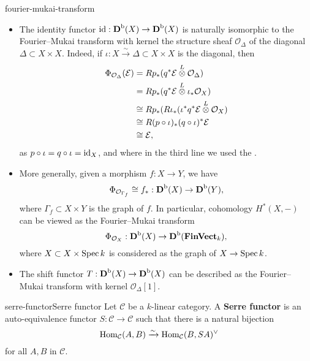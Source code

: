 \begin{example}{fourier-mukai-transform}
    \begin{itemize}
        \item The identity functor $\textup{id} : \textbf{D}^\textup{b}(X) \to \textbf{D}^\textup{b}(X)$ is naturally isomorphic to the Fourier--Mukai transform with kernel the structure sheaf $\mathcal{O}_\Delta$ of the diagonal $\Delta \subset X \times X$. Indeed, if $\iota : X \xrightarrow{\sim} \Delta \subset X \times X$ is the diagonal, then
        \[ \begin{aligned}
            \Phi_{\mathcal{O}_\Delta}(\mathcal{E})
                &= R p_* (q^* \mathcal{E} \overset{L}{\otimes} \mathcal{O}_\Delta) \\
                &= R p_* (q^* \mathcal{E} \overset{L}{\otimes} \iota_* \mathcal{O}_X) \\
                &\cong R p_* (R \iota_* (\iota^* q^* \mathcal{E} \overset{L}{\otimes} \mathcal{O}_X) \\
                &\cong R (p \circ \iota)_* (q \circ \iota)^* \mathcal{E} \\
                &\cong \mathcal{E} ,
        \end{aligned} \]
        as $p \circ \iota = q \circ \iota = \textup{id}_X$, and where in the third line we used the .
        
        \item More generally, given a morphism $f : X \to Y$, we have
        \[ \Phi_{\mathcal{O}_{\Gamma_f}} \cong f_* : \textbf{D}^\textup{b}(X) \to \textbf{D}^\textup{b}(Y) , \]
        where $\Gamma_f \subset X \times Y$ is the graph of $f$. In particular, cohomology $H^*(X, -)$ can be viewed as the Fourier--Mukai transform
        \[ \Phi_{\mathcal{O}_X} : \textbf{D}^\textup{b}(X) \to \textbf{D}^\textup{b}(\textbf{FinVect}_k) , \]
        where $X \subset X \times \operatorname{Spec} k$ is considered as the graph of $X \to \operatorname{Spec} k$.
        
        \item The shift functor $T : \textbf{D}^\textup{b}(X) \to \textbf{D}^\textup{b}(X)$ can be described as the Fourier--Mukai transform with kernel $\mathcal{O}_{\Delta}[1]$.
    \end{itemize}
\end{example}

\begin{topic}{serre-functor}{Serre functor}
    Let $\mathcal{C}$ be a $k$-linear category. A \textbf{Serre functor} is an auto-equivalence functor $S : \mathcal{C} \to \mathcal{C}$ such that there is a natural bijection
    \[ \operatorname{Hom}_\mathcal{C}(A, B) \xrightarrow{\sim} \operatorname{Hom}_\mathcal{C}(B, SA)^\vee \]
    for all $A, B$ in $\mathcal{C}$.
\end{topic}

